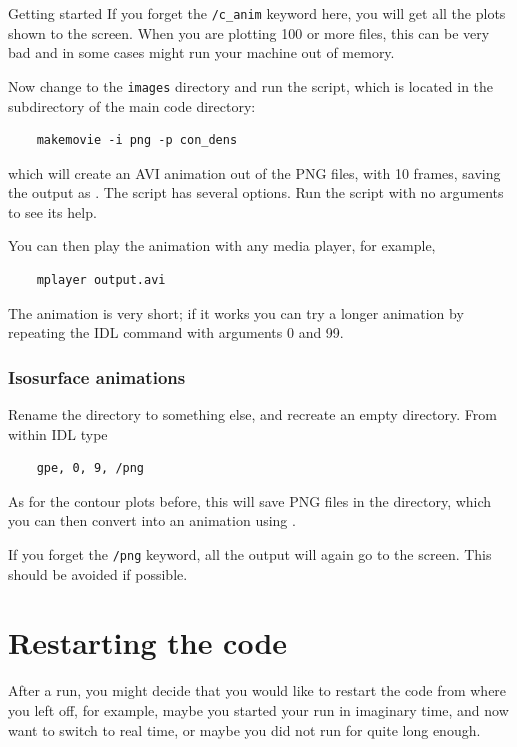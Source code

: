 \begin{chapter}{\label{cha:quickstart}Getting started}
  If you forget the \verb"/c_anim" keyword here, you will get all the plots
  shown to the screen.  When you are plotting 100 or more files, this can be
  very bad and in some cases might run your machine out of memory.

  Now change to the \verb"images" directory and run the 
  script, which is located in the  subdirectory of the main
  code directory:
  \begin{Verbatim}
    makemovie -i png -p con_dens
  \end{Verbatim}
  which will create an AVI animation out of the PNG files, with 10 frames,
  saving the output as .  The  script
  has several options.  Run the script with no arguments to see its help.

  You can then play the animation with any media player, for example,
  \begin{Verbatim}
    mplayer output.avi
  \end{Verbatim}
  The animation is very short; if it works you can try a longer animation by
  repeating the  IDL command with arguments 0 and 99.

  \subsubsection{Isosurface animations}
  Rename the  directory to something else, and recreate an
  empty  directory.  From within IDL type
  \begin{Verbatim}
    gpe, 0, 9, /png
  \end{Verbatim}
  As for the contour plots before, this will save PNG files in the
   directory, which you can then convert into an animation
  using .

  If you forget the \verb"/png" keyword, all the output will again go to the
  screen.  This should be avoided if possible.

  \section{\label{sec:restart}Restarting the code}
  After a run, you might decide that you would like to restart the code from
  where you left off, for example, maybe you started your run in imaginary
  time, and now want to switch to real time, or maybe you did not run for quite
  long enough.


\end{chapter}
